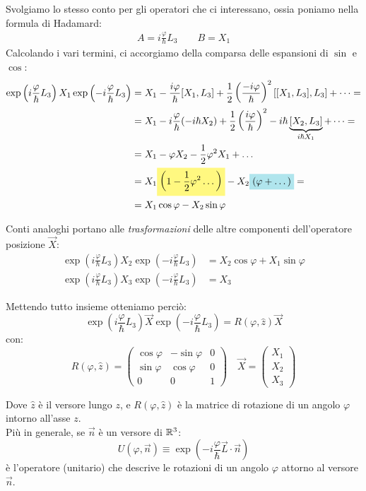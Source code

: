 \documentclass[../../FisicaTeorica.tex]{subfiles}
\begin{document}
Svolgiamo lo stesso conto per gli operatori che ci interessano, ossia poniamo nella formula di Hadamard:
\begin{align*}
A = i\frac{\varphi}{\hbar}L_3\qquad B = X_1
\end{align*}
Calcolando i vari termini, ci accorgiamo della comparsa delle espansioni di $\sin$ e $\cos$:
\begin{align*}
\exp\left(i\frac{\varphi}{\hbar}L_3 \right) X_1 \exp\left(-i\frac{\varphi}{\hbar}L_3 \right) &= X_1 - \frac{i\varphi}{\hbar}[X_1, L_3]+ \frac{1}{2}\left(\frac{-i\varphi}{\hbar}\right)^2 [[X_1, L_3], L_3] + \dots =\\
&= X_1 - i\frac{\varphi}{\hbar}(-i\hbar X_2)+\frac{1}{2}\left(\frac{i\varphi}{\hbar}\right)^2 -i\hbar \underbrace{[X_2,L_3]}_{i\hbar X_1}+\dots=\\
&=X_1 - \varphi X_2 - \frac{1}{2}\varphi^2 X_1 + \dots \\
&= X_1\hlc{Yellow}{\left(1-\frac{1}{2}\varphi^2 \dots\right)} - X_2\hlc{SkyBlue}{(\varphi + \dots)} =\\
&= X_1 \cos\varphi - X_2 \sin\varphi
\end{align*} 

Conti analoghi portano alle \textit{trasformazioni} delle altre componenti dell'operatore posizione $\vec{X}$:
\begin{align*}
\exp\left(i\frac{\varphi}{\hbar}L_3\right) X_2 \exp\left(-i\frac{\varphi}{\hbar} L_3 \right)&=X_2 \cos\varphi+X_1\sin\varphi\\
\exp\left(i\frac{\varphi}{\hbar}L_3\right) X_3 \exp\left(-i\frac{\varphi}{\hbar}L_3\right)&= X_3
\end{align*}

Mettendo tutto insieme otteniamo perciò:
\[
\exp\left(i\frac{\varphi}{\hbar}L_3\right) \vec{X} \exp\left(-i\frac{\varphi}{\hbar}L_3 \right) = R(\varphi, \hat{z}) \vec{X}
\]
con:
\[
R(\varphi, \hat{z}) = \begin{pmatrix}
\cos\varphi & -\sin\varphi & 0\\
\sin\varphi & \cos\varphi & 0\\
0 & 0 & 1
\end{pmatrix}\quad
\vec{X}=\begin{pmatrix} X_1 \\ X_2 \\ X_3 \end{pmatrix}
\]

Dove $\hat{z}$ è il versore lungo $z$, e $R(\varphi, \hat{z})$ è la matrice di rotazione di un angolo $\varphi$ intorno all'asse $z$.\\
Più in generale, se $\vec{n}$ è un versore di $\mathbb{R}^3$:
\[
U(\varphi, \vec{n})\equiv \exp\left({-i\frac{\varphi}{\hbar} \vec{L}\cdot \vec{n}}\right)
\]
è l'operatore (unitario) che descrive le rotazioni di un angolo $\varphi$ attorno al versore $\vec{n}$.\\
\end{document}

